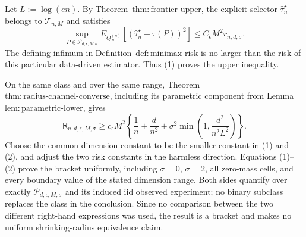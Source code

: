 Let \(L:=\log(en)\).  By Theorem~\(\mathrm{thm:frontier\text{-}upper}\), the explicit selector \(\widehat\tau_n^{\star}\) belongs to \(\mathcal T_{n,M}\) and satisfies
\[
 \sup_{P\in\mathcal P_{d,\epsilon,M,\sigma}}
 E_{Q_P^{(n)}}[(\widehat\tau_n^{\star}-\tau(P))^2]
 \le C_{\epsilon}M^2r_{n,d,\sigma}.
\tag{1}
\]
The defining infimum in Definition~\(\mathrm{def:minimax\text{-}risk}\) is no larger than the risk of this particular data-driven estimator.  Thus (1) proves the upper inequality.

On the same class and over the same range, Theorem~\(\mathrm{thm:radius\text{-}channel\text{-}converse}\), including its parametric component from Lemma~\(\mathrm{lem:parametric\text{-}lower}\), gives
\[
 \mathsf R_{n,d,\epsilon,M,\sigma}
 \ge c_{\epsilon}M^2\left\{
 \frac1n+\frac d{n^2}
 +\sigma^2\min\left(1,\frac{d^2}{n^2L^2}\right)
 \right\}.
\tag{2}
\]
Choose the common dimension constant to be the smaller constant in (1) and (2), and adjust the two risk constants in the harmless direction.  Equations (1)--(2) prove the bracket uniformly, including \(\sigma=0\), \(\sigma=2\), all zero-mass cells, and every boundary value of the stated dimension range.  Both sides quantify over exactly \(\mathcal P_{d,\epsilon,M,\sigma}\) and its induced iid observed experiment; no binary subclass replaces the class in the conclusion.  Since no comparison between the two different right-hand expressions was used, the result is a bracket and makes no uniform shrinking-radius equivalence claim.
